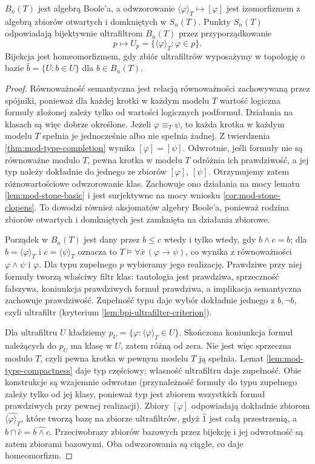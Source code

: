 \begin{twierdzenie}
\label{thm:mod-stone-boolean}
$B_n(T)$ jest algebrą Boole'a, a odwzorowanie
$\langle\varphi\rangle_T\mapsto[\varphi]$ jest izomorfizmem
z algebrą zbiorów otwartych i domkniętych w $S_n(T)$.
Punkty $S_n(T)$ odpowiadają bijektywnie ultrafiltrom
$B_n(T)$ przez przyporządkowanie
\[
p\longmapsto U_p=\{\langle\varphi\rangle_T:\varphi\in p\}.
\]
Bijekcja jest homeomorfizmem, gdy zbiór ultrafiltrów
wyposażymy w topologię o bazie
$\widehat b=\{U:b\in U\}$ dla $b\in B_n(T)$.
\end{twierdzenie}
\begin{proof}
Równoważność semantyczna jest relacją równoważności
zachowywaną przez spójniki, ponieważ dla każdej krotki
w każdym modelu $T$ wartość logiczna formuły złożonej
zależy tylko od wartości logicznych podformuł.
Działania na klasach są więc dobrze określone. Jeżeli $\varphi\equiv_T\psi$,
to każda krotka w każdym modelu $T$ spełnia je jednocześnie
albo nie spełnia żadnej. Z twierdzenia
\ref{thm:mod-type-completion} wynika $[\varphi]=[\psi]$.
Odwrotnie, jeśli formuły nie są równoważne modulo $T$,
pewna krotka w modelu $T$ odróżnia ich prawdziwość,
a jej typ należy dokładnie do jednego ze zbiorów
$[\varphi]$, $[\psi]$. Otrzymujemy zatem różnowartościowe
odwzorowanie klas. Zachowuje ono działania na mocy lematu
\ref{lem:mod-stone-basic} i jest surjektywne na mocy wniosku
\ref{cor:mod-stone-clopens}. To dowodzi również aksjomatów
algebry Boole'a, ponieważ rodzina zbiorów otwartych
i domkniętych jest zamknięta na działania zbiorowe.

Porządek w $B_n(T)$ jest dany przez $b\leq c$ wtedy i tylko
wtedy, gdy $b\land c=b$; dla $b=\langle\varphi\rangle_T$
i $c=\langle\psi\rangle_T$ oznacza to
$T\models\forall\bar x\,(\varphi\to\psi)$, co wynika
z równoważności $\varphi\land\psi$ i $\varphi$.
Dla typu zupełnego $p$ wybieramy jego realizację.
Prawdziwe przy niej formuły tworzą właściwy filtr klas:
tautologia jest prawdziwa, sprzeczność fałszywa, koniunkcja
prawdziwych formuł prawdziwa, a implikacja semantyczna
zachowuje prawdziwość. Zupełność typu daje wybór dokładnie
jednego z $b,\neg b$, czyli ultrafiltr (kryterium
\ref{lem:bpi-ultrafilter-criterion}).

Dla ultrafiltru $U$ kładziemy
$p_U=\{\varphi:\langle\varphi\rangle_T\in U\}$.
Skończona koniunkcja formuł należących do $p_U$
ma klasę w $U$, zatem różną od zera. Nie jest więc
sprzeczna modulo $T$, czyli pewna krotka w pewnym modelu
$T$ ją spełnia. Lemat \ref{lem:mod-type-compactness}
daje typ częściowy; własność ultrafiltru daje zupełność.
Obie konstrukcje są wzajemnie odwrotne (przynależność
formuły do typu zupełnego zależy tylko od jej klasy,
ponieważ typ jest zbiorem wszystkich formuł prawdziwych
przy pewnej realizacji).
Zbiory $[\varphi]$ odpowiadają dokładnie zbiorom
$\widehat{\langle\varphi\rangle_T}$, które tworzą bazę
na zbiorze ultrafiltrów, gdyż $\widehat 1$ jest całą
przestrzenią, a $\widehat b\cap\widehat c=\widehat{b\land c}$.
Przeciwobrazy zbiorów bazowych przez bijekcję i jej
odwrotność są zatem zbiorami bazowymi. Oba odwzorowania
są ciągłe, co daje homeomorfizm.
\end{proof}


